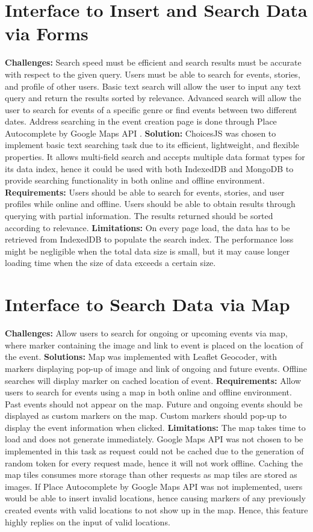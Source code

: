 \documentclass[11pt, a4paper]{article}
\begin{document}
\section{Interface to Insert and Search Data via Forms}
\textbf{Challenges:} Search speed must be efficient and search results must be
accurate with respect to the given query. Users must be able to search for events, stories, and
profile of other users. Basic text search will allow the user to input any text query and return the
results sorted by relevance. Advanced search will allow the user to search for events of a specific
genre or find events between two different dates. Address searching in the event creation page is
done through Place Autocomplete by Google Maps API \cite{google_maps_api}. \textbf{Solution:}
ChoicesJS was chosen to implement basic text searching task due to its efficient, lightweight, and
flexible properties. It allows multi-field search and accepts multiple data format types for its
data index, hence it could be used with both IndexedDB and MongoDB to provide searching
functionality in both online and offline environment. \textbf{Requirements:} Users should be able
to search for events, stories, and user profiles while online and offline. Users should be able to
obtain results through querying with partial information. The results returned should be sorted
according to relevance. \textbf{Limitations:} On every page load, the data has to be retrieved from
IndexedDB to populate the search index. The performance loss might be negligible when the total
data size is small, but it may cause longer loading time when the size of data exceeds a certain
size.

\section{Interface to Search Data via Map}
\textbf{Challenges:} Allow users to search for ongoing or upcoming events via map, where marker
containing the image and link to event is placed on the location of the event. \textbf{Solutions:}
Map was implemented with Leaflet Geocoder, with markers displaying pop-up of image and link of
ongoing and future events. Offline searches will display marker on cached location of event.
\textbf{Requirements:} Allow users to search for events using a map in both online and offline
environment. Past events should not appear on the map. Future and ongoing events should be
displayed as custom markers on the map. Custom markers should pop-up to display the event
information when clicked. \textbf{Limitations:} The map takes time to load and does not generate
immediately. Google Maps API was not chosen to be implemented in this task as request could not be
cached due to the generation of random token for every request made, hence it will not work offline.
Caching the map tiles consumes more storage than other requests as map tiles are stored as images.
If Place Autocomplete by Google Maps API \cite{google_maps_api} was not implemented, users would be
able to insert invalid locations, hence causing markers of any previously created events with valid
locations to not show up in the map. Hence, this feature highly replies on the input of valid
locations.
\end{document}
